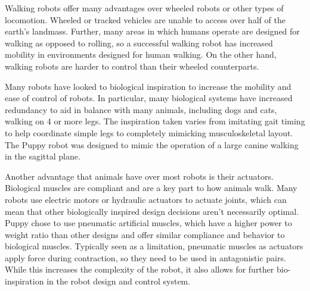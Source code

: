 Walking robots offer many advantages over wheeled robots or other types
of locomotion. Wheeled or tracked vehicles are unable to access over half
of the earth's landmass. \cite{BigDog} Further, many areas in which humans
operate are designed for walking as opposed to rolling, so a successful walking
robot has increased mobility in environments designed for human walking. On the
other hand, walking robots are harder to control than their wheeled
counterparts.

Many robots have looked to biological inspiration to increase the mobility and
ease of control of robots. In particular, many biological systems have increased
redundancy to aid in balance with many animals, including dogs and cats, walking
on 4 or more legs. The inspiration taken varies from imitating gait timing to
help coordinate simple legs to completely mimicking musculoskeletal layout. The
Puppy robot was designed to mimic the operation of a large canine walking in
the sagittal plane. \cite{PuppyDesign}

Another advantage that animals have over most robots is their actuators.
Biological muscles are compliant and are a key part to how animals walk. Many
robots use electric motors or hydraulic actuators to actuate joints, which can
mean that other biologically inspired design decisions aren't necessarily
optimal. Puppy chose to use pneumatic artificial muscles, which have a higher
power to weight ratio than other designs and offer similar compliance and
behavior to biological muscles. \cite{Tavakoli2008} Typically seen as a
limitation, pneumatic muscles as actuators apply force during contraction, so
they need to be used in antagonistic pairs. While this increases the complexity
of the robot, it also allows for further bio-inspiration in the robot design
and control system.

